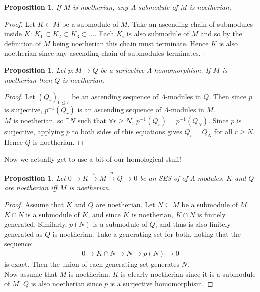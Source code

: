 \documentclass[12pt]{book}
\newtheorem{proposition}[theorem]{Proposition}
\theoremstyle{definition}
\begin{document}
\begin{proposition}
    If $M$ is noetherian, any $\Lambda$-submodule of $M$ is noetherian. 
\end{proposition}
\begin{proof}
    Let $K \subset M$ be a submodule of $M$. Take an ascending chain of submodules inside $K$: $K_1 \subset K_2 \subset K_3 \subset \dots$. Each $K_i$ is also submodule of $M$ and so by the definition of $M$ being noetherian this chain must terminate. Hence $K$ is also noetherian since any ascending chain of submodules terminates. 
\end{proof}

\begin{proposition}\label{noethsurge}
    Let $p : M \to Q$ be a surjective $\Lambda$-homomorphism. If $M$ is noetherian then $Q$ is noetherian.  
\end{proposition}
\begin{proof}
    Let $(Q_r)_{0 \leq r}$  be an ascending sequence of $\Lambda$-modules in $Q$. Then since $p$ is surjective, $p^{-1}(Q_r)$ is an ascending sequence of $\Lambda$-modules in $M$.\\
    $M$ is noetherian, so $\exists N$ such that $\forall r \geq N$, $p^{-1}(Q_r) = p^{-1}(Q_N)$. Since $p$ is surjective, applying $p$ to both sides of this equations gives $Q_r = Q_N$ for all $r \geq N$. Hence $Q$ is noetherian. 
\end{proof}

Now we actually get to use a bit of our homological stuff! 

\begin{proposition}
    Let $0 \rightarrow K \xrightarrow{i} M \xrightarrow{p} Q \rightarrow 0$ be an SES of of $\Lambda$-modules. $K$ and $Q$ are noetherian iff $M$ is noetherian.  
\end{proposition}
\begin{proof}
    Assume that $K$ and $Q$ are noetherian. Let $N \subseteq M$ be a submodule of $M$. $K \cap N$ is a submodule of $K$, and since $K$ is noetherian, $K \cap N$ is finitely generated. Similarly, $p(N)$ is a submodule of $Q$, and thus is also finitely generated as $Q$ is noetherian. Take a generating set for both, noting that the sequence: 
    \begin{align*}
        0 \rightarrow K \cap N \rightarrow N \rightarrow p(N) \rightarrow 0 
    \end{align*}
    is exact. Then the union of each generating set generates $N$. \\
    Now assume that $M$ is noetherian. $K$ is clearly noetherian since it is a submodule of $M$. $Q$ is also noetherian since $p$ is a surjective homomorphism. 
\end{proof}
\end{document}
